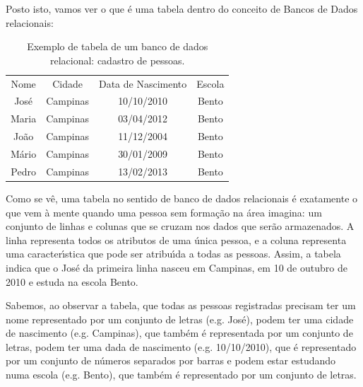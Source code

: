 \documentclass[
12pt,		%
openright,	%
twoside,  %
a4paper,			%
chapter=TITLE,		%
english,			%
french,				%
spanish,			%
brazil				%
]{USPSC-classe/USPSC}
\begin{document}
Posto isto, vamos ver o que \'e uma tabela dentro do conceito de Bancos de Dados relacionais:





















\begin{table}[htb]
\tiny
\caption{\label{f66c1ac239a347d2b455611f794c18300b1974b6}Exemplo de tabela de um banco de dados relacional: cadastro de pessoas.}

\centering
\begin{tabular}{|c|c|c|c|}
\hline
Nome  &  Cidade  &  Data de Nascimento  &  Escola \\
Jos\'e  &  Campinas  &  10/10/2010  &  Bento \\
Maria  &  Campinas  &  03/04/2012  &  Bento \\
Jo\~ao  &  Campinas  &  11/12/2004  &  Bento \\
M\'ario  &  Campinas  &  30/01/2009  &  Bento \\
Pedro  &  Campinas  &  13/02/2013  &  Bento \\
\hline
\end{tabular}
\end{table}


Como se v\^e, uma tabela no sentido de banco de dados relacionais \'e exatamente o que vem \`a mente quando uma pessoa sem forma\c{c}\~ao na \'area imagina: um conjunto de linhas e colunas que se cruzam nos dados que ser\~ao armazenados. A linha representa todos os atributos de uma \'unica pessoa, e a coluna representa uma caracter\'{\i}stica que pode ser atribu\'{\i}da a todas as pessoas. Assim, a tabela indica que o  Jos\'e da primeira linha nasceu em Campinas, em 10 de outubro de 2010 e estuda na escola Bento.

















Sabemos, ao observar a tabela, que todas as pessoas registradas precisam ter um nome representado por um conjunto de letras (e.g. Jos\'e), podem ter uma cidade de nascimento (e.g. Campinas), que tamb\'em \'e representada por um conjunto de letras, podem ter uma dada de nascimento (e.g. 10/10/2010), que \'e representado por um conjunto de n\'umeros separados por barras e podem estar estudando numa escola (e.g. Bento), que tamb\'em \'e representado por um conjunto de letras.
\end{document}
